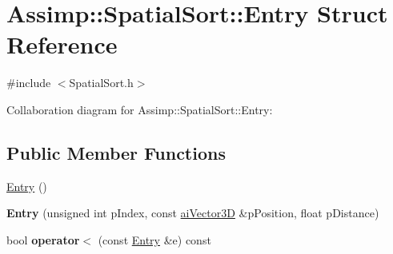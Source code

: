 \hypertarget{struct_assimp_1_1_spatial_sort_1_1_entry}{\section{Assimp\+:\+:Spatial\+Sort\+:\+:Entry Struct Reference}
\label{struct_assimp_1_1_spatial_sort_1_1_entry}
}


{\ttfamily \#include $<$Spatial\+Sort.\+h$>$}



Collaboration diagram for Assimp\+:\+:Spatial\+Sort\+:\+:Entry\+:
\subsection*{Public Member Functions}
\begin{DoxyCompactItemize}
\item 
\hyperlink{struct_assimp_1_1_spatial_sort_1_1_entry_a6ef35a4e38cf6baa1b9453b62e2566c0}{Entry} ()
\item 
\hypertarget{struct_assimp_1_1_spatial_sort_1_1_entry_a6d036b4e52fc2af0a80181936be01ce0}{{\bfseries Entry} (unsigned int p\+Index, const \hyperlink{structai_vector3_d}{ai\+Vector3\+D} \&p\+Position, float p\+Distance)}\label{struct_assimp_1_1_spatial_sort_1_1_entry_a6d036b4e52fc2af0a80181936be01ce0}

\item 
\hypertarget{struct_assimp_1_1_spatial_sort_1_1_entry_ad3de752f8913112711303f6cf1151726}{bool {\bfseries operator$<$} (const \hyperlink{struct_assimp_1_1_spatial_sort_1_1_entry}{Entry} \&e) const }\label{struct_assimp_1_1_spatial_sort_1_1_entry_ad3de752f8913112711303f6cf1151726}

\end{DoxyCompactItemize}
